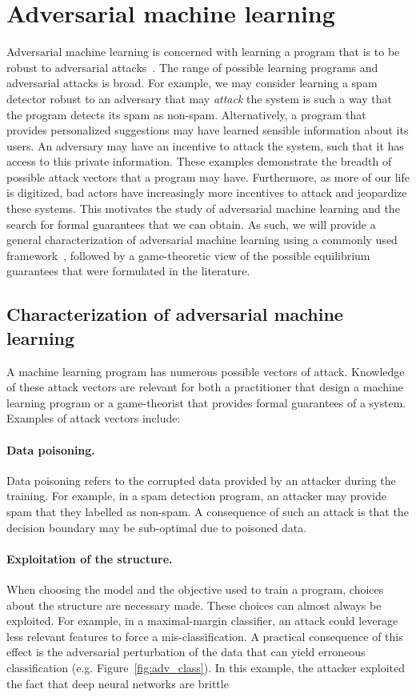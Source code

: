 \section{Adversarial machine learning}
\label{sec-review}

Adversarial machine learning is concerned with learning a program that is to be robust to adversarial attacks~\cite{aml_book}. The range of possible learning programs and adversarial attacks is broad. For example, we may consider learning a spam detector robust to an adversary that may \textit{attack} the system is such a way that the program detects its spam as non-spam. Alternatively, a program that provides personalized suggestions may have learned sensible information about its users. An adversary may have an incentive to attack the system, such that it has access to this private information. These examples demonstrate the breadth of possible attack vectors that a program may have. Furthermore, as more of our life is digitized, bad actors have increasingly more incentives to attack and jeopardize these systems. This motivates the study of adversarial machine learning and the search for formal guarantees that we can obtain. As such, we will provide a general characterization of adversarial machine learning using a commonly used framework~\cite{aml_book}, followed by a game-theoretic view of the possible equilibrium guarantees that were formulated in the literature.

\subsection{Characterization of adversarial machine learning}
A machine learning program has numerous possible vectors of attack. Knowledge of these attack vectors are relevant for both a practitioner that design a machine learning program or a game-theorist that provides formal guarantees of a system. Examples of attack vectors include:
\paragraph{Data poisoning.} Data poisoning refers to the corrupted data provided by an attacker during the training. For example, in a spam detection program, an attacker may provide spam that they labelled as non-spam. A consequence of such an attack is that the decision boundary may be sub-optimal due to poisoned data.
\paragraph{Exploitation of the structure.} When choosing the model and the objective used to train a program, choices about the structure are necessary made. These choices can almost always be exploited. For example, in a maximal-margin classifier, an attack could leverage less relevant features to force a mis-classification. A practical consequence of this effect is the adversarial perturbation of the data that can yield erroneous classification (e.g. Figure~\ref{fig:adv_class}). In this example, the attacker exploited the fact that deep neural networks are brittle 
